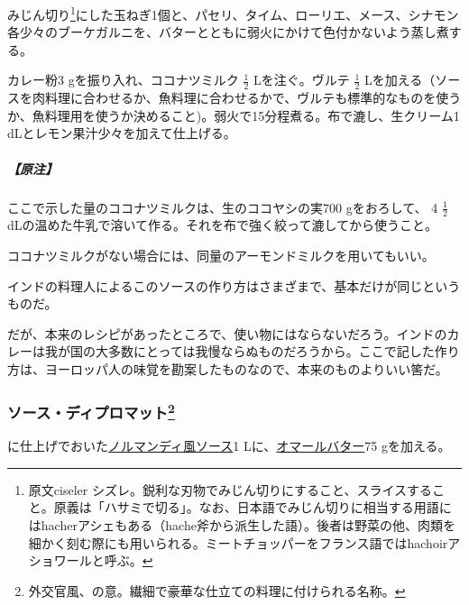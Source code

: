 \begin{recette}
みじん切り\footnote{原文ciseler
  シズレ。鋭利な刃物でみじん切りにすること、スライスすること。原義は「ハサミで切る」。なお、日本語でみじん切りに相当する用語にはhacherアシェもある（hache斧から派生した語）。後者は野菜の他、肉類を細かく刻む際にも用いられる。ミートチョッパーをフランス語ではhachoirアショワールと呼ぶ。}にした玉ねぎ1個と、パセリ、タイム、ローリエ、メース、シナモン各少々のブーケガルニを、バターとともに弱火にかけて色付かないよう蒸し煮する。

カレー粉3 gを振り入れ、ココナツミルク \(\frac{1}{2}\) Lを注ぐ。ヴルテ
\(\frac{1}{2}\)
Lを加える（ソースを肉料理に合わせるか、魚料理に合わせるかで、ヴルテも標準的なものを使うか、魚料理用を使うか決めること)。弱火で15分程煮る。布で漉し、生クリーム1
dLとレモン果汁少々を加えて仕上げる。

\hypertarget{nota-sauce-currie-indienne}{%
\subparagraph{【原注】}\label{nota-sauce-currie-indienne}}

ここで示した量のココナツミルクは、生のココヤシの実700 gをおろして、 4
\(\frac{1}{2}\)
dLの温めた牛乳で溶いて作る。それを布で強く絞って漉してから使うこと。

ココナツミルクがない場合には、同量のアーモンドミルクを用いてもいい。

インドの料理人によるこのソースの作り方はさまざまで、基本だけが同じというものだ。

だが、本来のレシピがあったところで、使い物にはならないだろう。インドのカレーは我が国の大多数にとっては我慢ならぬものだろうから。ここで記した作り方は、ヨーロッパ人の味覚を勘案したものなので、本来のものよりいい筈だ。

\atoaki{}

\hypertarget{sauce-diplomate}{%
\subsubsection[ソース・ディプロマット]{\texorpdfstring{ソース・ディプロマット\footnote{外交官風、の意。繊細で豪華な仕立ての料理に付けられる名称。}}{ソース・ディプロマット}}\label{sauce-diplomate}}



に仕上げでおいた\protect\hyperlink{sauce-normande}{ノルマンディ風ソース}1
Lに、\protect\hyperlink{beurre-de-homard}{オマールバター}75 gを加える。


\end{recette}

